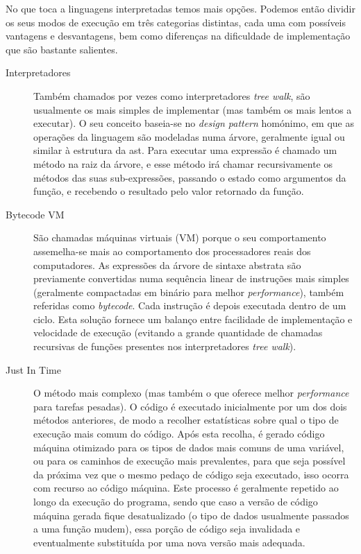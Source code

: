 No que toca a linguagens interpretadas temos mais opções. Podemos então dividir os seus modos de execução em três categorias distintas, cada uma com possíveis vantagens e desvantagens, bem como diferenças na dificuldade de implementação que são bastante salientes.
\begin{description}
 \item[Interpretadores] Também chamados por vezes como interpretadores \textit{tree walk}, são usualmente os mais simples de implementar (mas também os mais lentos a executar). O seu conceito baseia-se no \textit{design pattern} homónimo, em que as operações da linguagem são modeladas numa árvore, geralmente igual ou similar à estrutura da \acrshort{ast}. Para executar uma expressão é chamado um método na raiz da árvore, e esse método irá chamar recursivamente os métodos das suas sub-expressões, passando o estado como argumentos da função, e recebendo o resultado pelo valor retornado da função.
 \item[Bytecode VM] São chamadas máquinas virtuais (VM) porque o seu comportamento assemelha-se mais ao comportamento dos processadores reais dos computadores. As expressões da árvore de sintaxe abstrata são previamente convertidas numa sequência linear de instruções mais simples (geralmente compactadas em binário para melhor \textit{performance}), também referidas como \textit{bytecode}. Cada instrução é depois executada dentro de um ciclo. Esta solução fornece um balanço entre facilidade de implementação e velocidade de execução (evitando a grande quantidade de chamadas recursivas de funções presentes nos interpretadores \textit{tree walk}).
 \item[Just In Time] O método mais complexo (mas também o que oferece melhor \textit{performance} para tarefas pesadas). O código é executado inicialmente por um dos dois métodos anteriores, de modo a recolher estatísticas sobre qual o tipo de execução mais comum do código. Após esta recolha, é gerado código máquina otimizado para os tipos de dados mais comuns de uma variável, ou para os caminhos de execução mais prevalentes, para que seja possível da próxima vez que o mesmo pedaço de código seja executado, isso ocorra com recurso ao código máquina. Este processo é geralmente repetido ao longo da execução do programa, sendo que caso a versão de código máquina gerada fique desatualizado (o tipo de dados usualmente passados a uma função mudem), essa porção de código seja invalidada e eventualmente substituída por uma nova versão mais adequada.
 \end{description}

